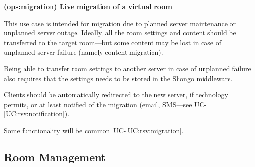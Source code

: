 \documentclass[a4paper]{report}
\makeatletter
\newcounter{UCcounter}
\newenvironment{UseCases}%
	{\begin{list}{\textbf{UC-\arabic{UCcounter}}}{\@nmbrlisttrue\def\@listctr{UCcounter}}}%
	{\end{list}}
\newcommand{\UClabel}[1]{\label{UC:#1}}
\newcommand{\UCref}[1]{UC-\ref{UC:#1}}
\newcommand{\UseCase}[2]{\item\UClabel{#2} \textbf{(#2) #1}\\ \nopagebreak}
\makeatother
\begin{document}
\begin{UseCases}

\UseCase{Live migration of a virtual room}{ops:migration}

This use case is intended for migration due to planned server maintenance or
unplanned server outage.  Ideally, all the room settings and content should be
transferred to the target room---but some content may be lost in case of
unplanned server failure (namely content migration).

Being able to transfer room settings to another server in case of unplanned
failure also requires that the settings needs to be stored in the Shongo
middleware.

Clients should be automatically redirected to the new server, if technology
permits, or at least notified of the migration (email, SMS---see
\UCref{rsv:notification}).

Some functionality will be common~\UCref{rsv:migration}.

\end{UseCases}

\subsection{Room Management}
\end{document}
